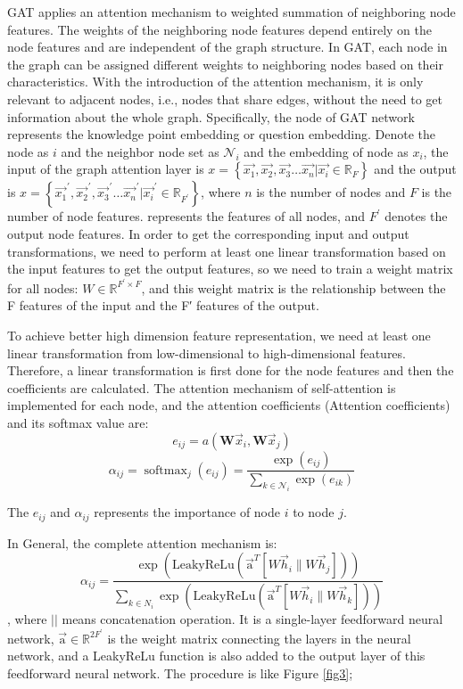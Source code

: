 GAT applies an attention mechanism to weighted summation of neighboring node features. The weights of the neighboring node features depend entirely on the node features and are independent of the graph structure. In GAT, each node in the graph can be assigned different weights to neighboring nodes based on their characteristics. With the introduction of the attention mechanism, it is only relevant to adjacent nodes, i.e., nodes that share edges, without the need to get information about the whole graph. Specifically, the node of GAT network represents the knowledge point embedding or question embedding. Denote the node as $i$ and the neighbor node set as $\mathcal{N}_{i}$ and the embedding of node as $x_i$, the input of the graph attention layer is $x=\left\{\overrightarrow{x_{1}}, \overrightarrow{x_{2}}, \overrightarrow{x_{3}} \ldots \overrightarrow{x_{n}}|\overrightarrow{x_{i}}\in \mathbb{R}_{F}\right\}$ and the output is $ x=\left\{\overrightarrow{x_{1}}^{\prime}, \overrightarrow{x_{2}}^{\prime}, \overrightarrow{x_{3}}^{\prime} \ldots \overrightarrow{x_{n}}^{\prime}|\overrightarrow{x_{i}}^\prime\in \mathbb{R}_{F^\prime}\right\}$, where $n$ is the number of nodes and $F$ is the number of node features. represents the features of all nodes, and $F^{\prime}$ denotes the output node features. In order to get the corresponding input and output transformations, we need to perform at least one linear transformation based on the input features to get the output features, so we need to train a weight matrix for all nodes: $W \in \mathbb { R } ^ { F ^ { \prime } \times F }$, and this weight matrix is the relationship between the F features of the input and the F′ features of the output.

To achieve better high dimension feature representation, we need at least one linear transformation from low-dimensional to high-dimensional features. Therefore, a linear transformation is first done for the node features and then the coefficients are calculated. The attention mechanism of self-attention is implemented for each node, and the attention coefficients (Attention coefficients) and its softmax value are:
$$e_{i j}=a\left(\mathbf{W} \vec{x}_{i}, \mathbf{W} \vec{x}_{j}\right)$$
$$\alpha_{i j}=\operatorname{softmax}_{j}\left(e_{i j}\right)=\frac{\exp \left(e_{i j}\right)}{\sum_{k \in \mathcal{N}_{i}} \exp \left(e_{i k}\right)}$$

The $e_{ij}$ and $\alpha_{ij}$ represents the importance of node $i$ to node $j$. 

In General, the complete attention mechanism is:
$$
\alpha_{i j}=\frac{\exp \left(\text{LeakyReLu}\left(\overrightarrow{\mathrm{a}}^{T}\left[W \vec{h}_{i} \| W \vec{h}_{j}\right]\right)\right)}{\sum_{k \in N_{i}} \exp \left(\text{LeakyReLu}\left(\overrightarrow{\mathrm{a}}^{T}\left[W \vec{h}_{i} \| W \vec{h}_{k}\right]\right)\right)}
$$, where $||$ means concatenation operation. It is a single-layer feedforward neural network, $\overrightarrow { \mathrm { a } } \in \mathbb { R } ^ { 2 F ^ { \prime } }$ is the weight matrix connecting the layers in the neural network, and a LeakyReLu function is also added to the output layer of this feedforward neural network. The procedure is like Figure \ref{fig3};

